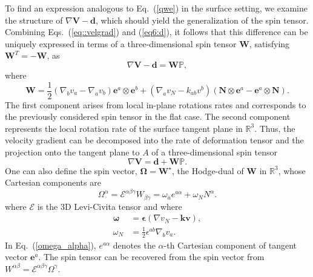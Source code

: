 To find an expression analogous  to Eq.~(\ref{qwe}) in the surface setting, we examine the structure of $\nabla \bm{V} - \bm{d}$, which should yield the generalization of the spin tensor. Combining Eqs.~(\ref{eq::velgrad}) and (\ref{eq6:d}), it follows that this difference can be uniquely expressed in terms of a three-dimensional spin tensor $\bm{W}$, satisfying $\bm{W}^T=-\bm{W}$, as
\begin{equation}
	\nabla \bm{V} - \bm{d} = \bm{W} \mathbb{P},
\end{equation}
where
\begin{equation}
	\bm{W} = \frac{1}{2}\left(\nabla_b v_a - \nabla_a v_b\right) \bm{e}^a\otimes \bm{e}^b + \left(\nabla_a v_N - k_{ab} v^b \right) \left(\bm{N} \otimes \bm{e}^a -  \bm{e}^a\otimes \bm{N}\right).
\end{equation}
The first component arises from local in-plane rotations rates and corresponds to the previously considered spin tensor in the flat case. The second component represents the local rotation rate of the surface tangent plane in $\mathbb{R}^3$. Thus, the velocity gradient can be decomposed into the rate of deformation tensor and the projection onto the tangent plane to $A$ of a three-dimensional spin tensor
\begin{equation}
	\nabla \bm{V} = \bm{d} + \bm{W} \mathbb{P}.
\end{equation}
One can also define the spin vector, $\bm{\Omega} = \bm{W}^\star$, the Hodge-dual of $\bm{W}$ in $\mathbb{R}^3$, whose Cartesian components are
\begin{equation} \label{omega_alpha}
	\Omega^\alpha = \mathcal{E}^{\alpha\beta\gamma} W_{\beta\gamma} = \omega_a  e^{a\alpha} + \omega_N N^{\alpha}.
\end{equation}
where $\bm{\mathcal{E}}$ is the 3D Levi-Civita tensor and where
\begin{align}
	\bm{\omega} &= \bm{\epsilon}\left(\nabla v_N - \bm{k}\bm{v}\right),\label{eq6:omega}\\
	\omega_N &= \frac{1}{2} \epsilon^{ab} \nabla_b v_a. \label{eq6:omegaN}
\end{align}
In Eq.~(\ref{omega_alpha}), $e^{a\alpha}$ denotes the $\alpha$-th Cartesian component of tangent vector $\bm{e}^a$. The spin tensor can be recovered from the spin vector from $W^{\alpha\beta} = \mathcal{E}^{\alpha\beta\gamma}\Omega^\gamma$. 

